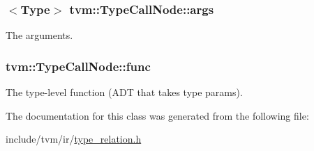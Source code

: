 \subsubsection[{\texorpdfstring{args}{args}}]{$<${\bf Type}$>$ tvm\+::\+Type\+Call\+Node\+::args}\hypertarget{classtvm_1_1TypeCallNode_a2e5fb370089941ae6fae26a110ad3783}{}\label{classtvm_1_1TypeCallNode_a2e5fb370089941ae6fae26a110ad3783}


The arguments. 

\subsubsection[{\texorpdfstring{func}{func}}]{ tvm\+::\+Type\+Call\+Node\+::func}\hypertarget{classtvm_1_1TypeCallNode_ad411852baaa607438122219b714773ea}{}\label{classtvm_1_1TypeCallNode_ad411852baaa607438122219b714773ea}


The type-\/level function (A\+DT that takes type params). 



The documentation for this class was generated from the following file\+:\begin{DoxyCompactItemize}
\item 
include/tvm/ir/\hyperlink{type__relation_8h}{type\+\_\+relation.\+h}\end{DoxyCompactItemize}
